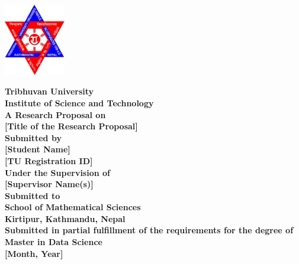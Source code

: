 \documentclass[12pt, a4paper]{report}
\begin{document}
\begin{titlepage}
    \begin{center}
        \includegraphics[width=0.2\textwidth]{assets/logo.eps}\\[0.5cm] %
        \vspace{0.5cm}
        
        {\Large \textbf{Tribhuvan University}}\\
        {\Large \textbf{Institute of Science and Technology}}\\[1.0cm]

        {\large \textbf{A Research Proposal on}}\\

        {\Large \textbf{[Title of the Research Proposal]}}\\[1.0cm]

        \textbf{Submitted by}\\
        {\large \textbf{[Student Name]}}\\
        \textbf{[TU Registration ID]}\\[1cm]

        \textbf{Under the Supervision of}\\
        {\large \textbf{[Supervisor Name(s)]}}\\[1cm]

        \textbf{Submitted to}\\
        {\large \textbf{School of Mathematical Sciences}}\\
        {\large \textbf{Kirtipur, Kathmandu, Nepal}}\\[1cm]

        \textbf{Submitted in partial fulfillment of the requirements for the degree of Master in Data Science}\\[2cm]

        \textbf{[Month, Year]}\\
    \end{center}
\end{titlepage}

\tableofcontents
\clearpage

\end{document}
